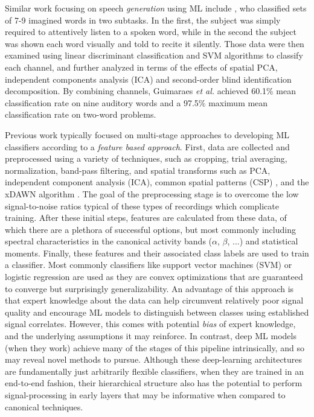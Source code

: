 \documentclass[utf8]{frontiersSCNS} %
\begin{document}

Similar work focusing on speech \emph{generation} using ML include \cite{Guimaraes2007}, who classified sets of 7-9 imagined words in two subtasks. In the first, the subject was simply required to attentively listen to a spoken word, while in the second the subject was shown each word visually and told to recite it silently. Those data were then examined using linear discriminant classification and SVM algorithms to classify each channel, and further analyzed in terms of the effects of spatial PCA, independent components analysis (ICA) and second-order blind identification decomposition. By combining channels, Guimaraes {\em et al.} achieved 60.1\% mean classification rate on nine auditory words and a 97.5\% maximum mean classification rate on two-word problems.


Previous work typically focused on multi-stage approaches to developing ML classifiers according to a \emph{feature based approach}. First, data are collected and preprocessed using a variety of techniques, such as cropping, trial averaging, normalization, band-pass filtering, and spatial transforms such as PCA, independent component analysis (ICA), common spatial patterns (CSP) \cite{Muller-Gerking1999}, and the xDAWN algorithm \cite{Rivet2009}. The goal of the preprocessing stage is to overcome the low signal-to-noise ratios typical of these types of recordings which complicate training. After these initial steps, features are calculated from these data, of which there are a plethora of successful options, but most commonly including spectral characteristics in the canonical activity bands ($\alpha$, $\beta$, ...) and statistical moments. Finally, these features and their associated class labels are used to train a classifier. Most commonly classifiers like support vector machines (SVM) or logistic regression are used as they are convex optimizations that are guaranteed to converge but surprisingly generalizability. An advantage of this approach is that expert knowledge about the data can help circumvent relatively poor signal quality and encourage ML models to distinguish between classes using established signal correlates. However, this comes with potential \emph{bias} of expert knowledge, and the underlying assumptions it may reinforce. In contrast, deep ML models (when they work) achieve many of the stages of this pipeline intrinsically, and so may reveal novel methods to pursue. Although these deep-learning architectures are fundamentally just arbitrarily flexible classifiers, when they are trained in an end-to-end fashion, their hierarchical structure also has the potential to perform signal-processing in early layers that may be informative when compared to canonical techniques.
\end{document}
